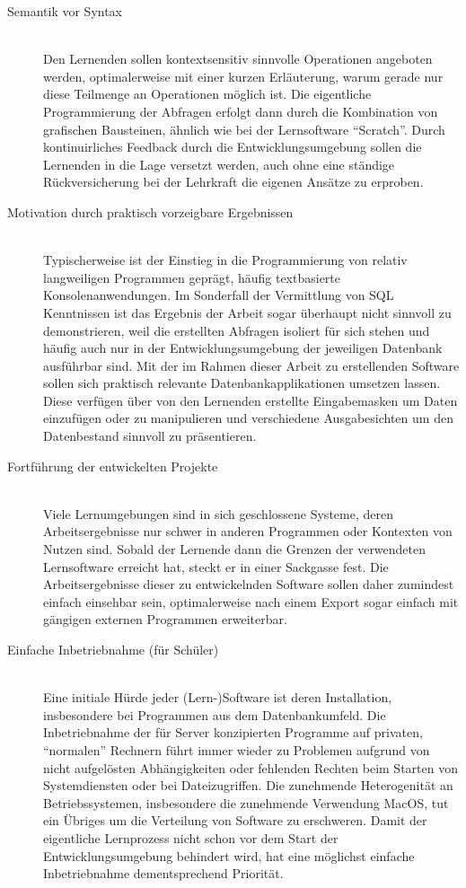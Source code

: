 \documentclass[paper=a4,fontsize=11pt,parskip=half]{scrartcl}
\begin{document}
\begin{description}
\item[Semantik vor Syntax] \hfill\\
  Den Lernenden sollen kontextsensitiv sinnvolle Operationen angeboten werden, optimalerweise mit einer kurzen Erläuterung, warum gerade nur diese Teilmenge an Operationen möglich ist. Die eigentliche Programmierung der Abfragen erfolgt dann durch die Kombination von grafischen Bausteinen, ähnlich wie bei der Lernsoftware ``Scratch''. Durch kontinuirliches Feedback durch die Entwicklungsumgebung sollen die Lernenden in die Lage versetzt werden, auch ohne eine ständige Rückversicherung bei der Lehrkraft die eigenen Ansätze zu erproben.
\item[Motivation durch praktisch vorzeigbare Ergebnissen] \hfill\\
  Typischerweise ist der Einstieg in die Programmierung von relativ langweiligen Programmen geprägt, häufig textbasierte Konsolenanwendungen. Im Sonderfall der Vermittlung von SQL Kenntnissen ist das Ergebnis der Arbeit sogar überhaupt nicht sinnvoll zu demonstrieren, weil die erstellten Abfragen isoliert für sich stehen und häufig auch nur in der Entwicklungsumgebung der jeweiligen Datenbank ausführbar sind. Mit der im Rahmen dieser Arbeit zu erstellenden Software sollen sich praktisch relevante Datenbankapplikationen umsetzen lassen. Diese verfügen über von den Lernenden erstellte Eingabemasken um Daten einzufügen oder zu manipulieren und verschiedene Ausgabesichten um den Datenbestand sinnvoll zu präsentieren.
\item[Fortführung der entwickelten Projekte] \hfill \\
  Viele Lernumgebungen sind in sich geschlossene Systeme, deren Arbeitsergebnisse nur schwer in anderen Programmen oder Kontexten von Nutzen sind. Sobald der Lernende dann die Grenzen der verwendeten Lernsoftware erreicht hat, steckt er in einer Sackgasse fest. Die Arbeitsergebnisse dieser zu entwickelnden Software sollen daher zumindest einfach einsehbar sein, optimalerweise nach einem Export sogar einfach mit gängigen externen Programmen erweiterbar.
\item[Einfache Inbetriebnahme (für Schüler)] \hfill \\
  Eine initiale Hürde jeder (Lern-)Software ist deren Installation, insbesondere bei Programmen aus dem Datenbankumfeld. Die Inbetriebnahme der für Server konzipierten Programme auf privaten, ``normalen'' Rechnern führt immer wieder zu Problemen aufgrund von nicht aufgelösten Abhängigkeiten oder fehlenden Rechten beim Starten von Systemdiensten oder bei Dateizugriffen. Die zunehmende Heterogenität an Betriebssystemen, insbesondere die zunehmende Verwendung MacOS, tut ein Übriges um die Verteilung von Software zu erschweren. Damit der eigentliche Lernprozess nicht schon vor dem Start der Entwicklungsumgebung behindert wird, hat eine möglichst einfache Inbetriebnahme dementsprechend Priorität.

\end{description}
\end{document}

